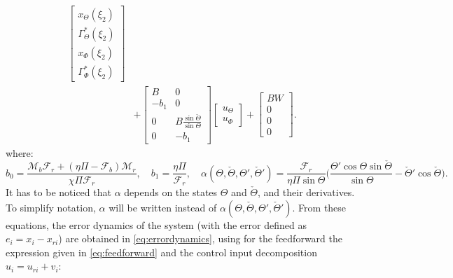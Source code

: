 \documentclass[../main.tex]{subfiles}
\begin{document}
\begin{align}
	\begin{bmatrix}
	x_\Theta(\xi_2) \\
	\Gamma_\Theta^{*}(\xi_2) \\
	x_\Phi(\xi_2) \\
	\Gamma_\Phi^{*} (\xi_2)
	\end{bmatrix}\nonumber \\ 
	&+
	\begin{bmatrix}
	B & 0 \\
	-b_1 & 0 \\
	0 & B \frac{\sin \check{\Theta}}{\sin \Theta} \\
	0 & -b_1
	\end{bmatrix}
	\begin{bmatrix}
	u_\Theta \\
	u_\Phi
	\end{bmatrix} +
	\begin{bmatrix}
	BW \\
	0 \\
	0 \\
	0
	\end{bmatrix}.
	\end{align}
	where:
	\begin{equation}
		b_0 = \frac{\mathcal{M}_b \mathcal{F}_r + (\eta \Pi - \mathcal{F}_b)\mathcal{M}_r}{\chi \Pi \mathcal{F}_r}, \quad b_1 = \frac{\eta \Pi}{\mathcal{F}_r}, \quad \alpha (\Theta,\check{\Theta},\Theta',\check{\Theta}') = \frac{\mathcal{F}_r}{\eta \Pi \sin \Theta} \bigg( \frac{\Theta' \cos \Theta \sin \check{\Theta}}{\sin \Theta}  - \check{\Theta}' \cos \check{\Theta}\bigg). \label{eq:Constants}
	\end{equation}
	It has to be noticed that $\alpha$ depends on the states $\Theta$ and $\check{\Theta}$, and their derivatives. To simplify notation, $\alpha$ will be written  instead of $\alpha(\Theta,\check{\Theta}, \Theta', \check{\Theta}')$. From these equations, the error dynamics of the system (with the error defined as $e_i = x_i - x_{ri}$) are obtained in \eqref{eq:errordynamics}, using for the feedforward the expression given in \eqref{eq:feedforward} and the control input decomposition $u_i = u_{ri} + v_i$:
\end{document}
